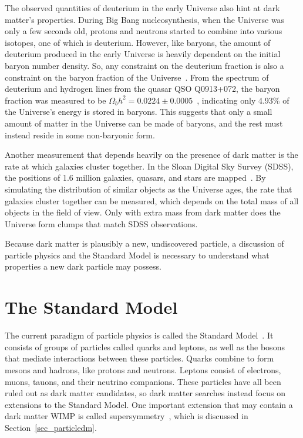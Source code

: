 The observed quantities of deuterium in the early Universe also hint at dark matter's properties.
During Big Bang nucleosynthesis, when the Universe was only a few seconds old, protons and neutrons started to combine into various isotopes, one of which is deuterium.
However, like baryons, the amount of deuterium produced in the early Universe is heavily dependent on the initial baryon number density.
So, any constraint on the deuterium fraction is also a constraint on the baryon fraction of the Universe~\cite{deuterium1,deuterium2}.
From the spectrum of deuterium and hydrogen lines from the quasar QSO Q0913+072, the baryon fraction was measured to be $\Omega_{b}h^2 = 0.0224 \pm 0.0005$~\cite{deuterium3}, indicating only 4.93\% of the Universe's energy is stored in baryons.
This suggests that only a small amount of matter in the Universe can be made of baryons, and the rest must instead reside in some non-baryonic form.

Another measurement that depends heavily on the presence of dark matter is the rate at which galaxies cluster together.
In the Sloan Digital Sky Survey (SDSS), the positions of 1.6 million galaxies, quasars, and stars are mapped~\cite{sdss_release}.
By simulating the distribution of similar objects as the Universe ages, the rate that galaxies cluster together can be measured, which depends on the total mass of all objects in the field of view.
Only with extra mass from dark matter does the Universe form clumps that match SDSS observations.

Because dark matter is plausibly a new, undiscovered particle, a discussion of particle physics and the Standard Model is necessary to understand what properties a new dark particle may possess.

\section{The Standard Model}

The current paradigm of particle physics is called the Standard Model~\cite{standardmodel}.
It consists of groups of particles called quarks and leptons, as well as the bosons that mediate interactions between these particles.
Quarks combine to form mesons and hadrons, like protons and neutrons.
Leptons consist of electrons, muons, tauons, and their neutrino companions.
These particles have all been ruled out as dark matter candidates, so dark matter searches instead focus on extensions to the Standard Model.
One important extension that may contain a dark matter WIMP is called supersymmetry~\cite{Jungman:1995df}, which is discussed in Section~\ref{sec_particledm}.

